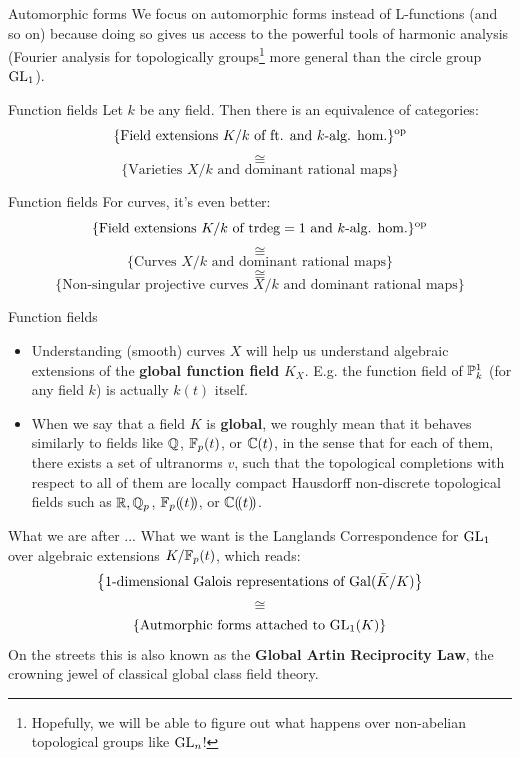 \documentclass{beamer}
\begin{document}
    \begin{frame}{Automorphic forms}
         We focus on automorphic forms instead of L-functions (and so on) because doing so gives us access to the powerful tools of harmonic analysis (Fourier analysis for topologically groups\footnote{Hopefully, we will be able to figure out what happens over non-abelian topological groups like $\GL_n$!} more general than the circle group $\GL_1$). 
    \end{frame}
    
    \begin{frame}{Function fields}
        Let $k$ be any field. Then there is an equivalence of categories:
            $$\{\text{Field extensions $K/k$ of ft. and $k$-alg. hom.}\}^{\op}$$
            $$\cong$$
            $$\{\text{Varieties $X/k$ and dominant rational maps}\}$$
    \end{frame}
    
    \begin{frame}{Function fields}
        For curves, it's even better:
            $$\{\text{Field extensions $K/k$ of $\trdeg = 1$ and $k$-alg. hom.}\}^{\op}$$
            $$\cong$$
            $$\{\text{Curves $X/k$ and dominant rational maps}\}$$
            $$\cong$$
            $$\{\text{Non-singular projective curves $X/k$ and dominant rational maps}\}$$
    \end{frame}
    
    \begin{frame}{Function fields}
        \begin{itemize}
            \item Understanding (smooth) curves $X$ will help us understand algebraic extensions of the \textbf{global function field} $K_X$. E.g. the function field of $\P^1_k$ (for any field $k$) is actually $k(t)$ itself.
            \item When we say that a field $K$ is \textbf{global}, we roughly mean that it behaves similarly to fields like $\Q$, $\F_p(t)$, or $\bbC(t)$, in the sense that for each of them, there exists a set of ultranorms $v$, such that the topological completions with respect to all of them are locally compact Hausdorff non-discrete topological fields such as $\R, \Q_p$, $\F_p(\!(t)\!)$, or $\bbC(\!(t)\!)$.
        \end{itemize}
    \end{frame}
    
    \begin{frame}{What we are after ...}
        What we want is the Langlands Correspondence for $\GL_1$ over algebraic extensions $K/\F_p(t)$, which reads:
            $$\left\{\text{$1$-dimensional Galois representations of $\Gal(\bar{K}/K)$}\right\}$$
            $$\cong$$
            $$\left\{\text{Autmorphic forms attached to $\GL_1(K)$}\right\}$$
        On the streets this is also known as the \textbf{Global Artin Reciprocity Law}, the crowning jewel of classical global class field theory.
    \end{frame}
    
\end{document}
